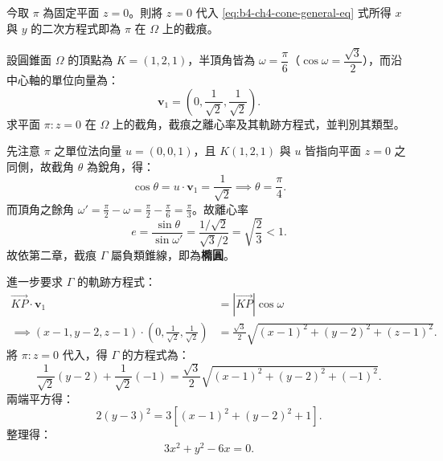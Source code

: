 今取 $\pi$ 為固定平面 $z = 0$。則將 $z = 0$ 代入 \eqref{eq:b4-ch4-cone-general-eq} 式所得 $x$ 與 $y$ 的二次方程式即為 $\pi$ 在 $\Omega$ 上的截痕。

\begin{discussion}
設圓錐面 $\Omega$ 的頂點為 $K = (1, 2, 1)$，半頂角皆為 $\omega = \dfrac{\pi}{6}$（$\cos\omega = \dfrac{\sqrt{3}}{2}$），而沿中心軸的單位向量為：
\[
\mathbf{v}_1 = \left(0, \frac{1}{\sqrt{2}}, \frac{1}{\sqrt{2}}\right).
\]
求平面 $\pi: z = 0$ 在 $\Omega$ 上的截角，截痕之離心率及其軌跡方程式，並判別其類型。
\end{discussion}

\begin{solution}
先注意 $\pi$ 之單位法向量 $u = (0, 0, 1)$，且 $K(1, 2, 1)$ 與 $u$ 皆指向平面 $z = 0$ 之同側，故截角 $\theta$ 為銳角，得：
\[
\cos\theta = u \cdot \mathbf{v}_1 = \frac{1}{\sqrt{2}} \implies \theta = \frac{\pi}{4}.
\]
而頂角之餘角 $\omega' = \frac{\pi}{2} - \omega = \frac{\pi}{2} - \frac{\pi}{6} = \frac{\pi}{3}$。故離心率
\[
e = \frac{\sin\theta}{\sin\omega'} = \frac{1/\sqrt{2}}{\sqrt{3}/2} = \sqrt{\frac{2}{3}} < 1.
\]
故依第二章，截痕 $\Gamma$ 屬負類錐線，即為\textbf{橢圓}。

進一步要求 $\Gamma$ 的軌跡方程式：
\[
\begin{aligned}
\vec{KP} \cdot \mathbf{v}_1 &= |\vec{KP}| \cos\omega \\
\implies (x - 1, y - 2, z - 1) \cdot \left(0, \frac{1}{\sqrt{2}}, \frac{1}{\sqrt{2}}\right) &= \frac{\sqrt{3}}{2} \sqrt{(x - 1)^2 + (y - 2)^2 + (z - 1)^2}.
\end{aligned}
\]
將 $\pi: z = 0$ 代入，得 $\Gamma$ 的方程式為：
\[
\frac{1}{\sqrt{2}}(y - 2) + \frac{1}{\sqrt{2}}(-1) = \frac{\sqrt{3}}{2}\sqrt{(x - 1)^2 + (y - 2)^2 + (-1)^2}.
\]
兩端平方得：
\[
2(y - 3)^2 = 3[(x - 1)^2 + (y - 2)^2 + 1].
\]
整理得：
\begin{equation}
3x^2 + y^2 - 6x = 0.
\label{eq:b4-ch4-ex16-ellipse}
\end{equation}

\begin{figure}[htbp]
\centering
{}
\end{figure}
\end{solution}
